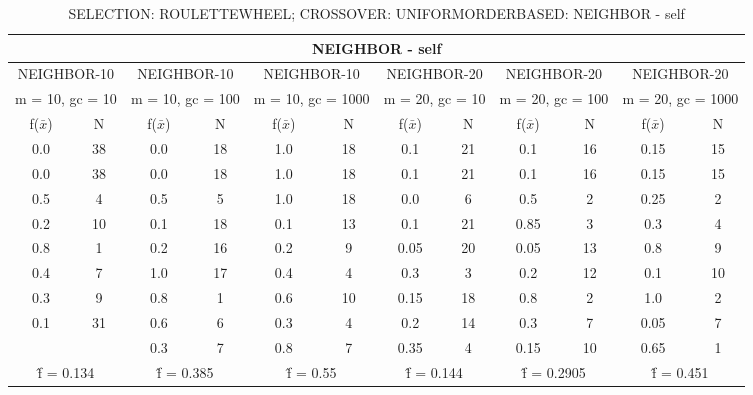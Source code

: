 \begin{table}[H]
	\centering
	\caption{SELECTION: ROULETTEWHEEL; CROSSOVER: UNIFORMORDERBASED: NEIGHBOR - self}
	\begin{adjustbox}{width=1\textwidth}
		\begin{tabular}{ |c|c||c|c||c|c||c|c||c|c||c|c| }
			\hline
			\multicolumn{12}{|c|}{NEIGHBOR - self} \\
			\hline
			\multicolumn{2}{|c||}{NEIGHBOR-10} & \multicolumn{2}{c||}{NEIGHBOR-10} & \multicolumn{2}{c||}{NEIGHBOR-10} & \multicolumn{2}{c||}{NEIGHBOR-20} & \multicolumn{2}{c||}{NEIGHBOR-20} & \multicolumn{2}{c|}{NEIGHBOR-20}\\
			\hline
			\multicolumn{2}{|c||}{m = 10, gc = 10} & \multicolumn{2}{c||}{m = 10, gc = 100} & \multicolumn{2}{c||}{m = 10, gc = 1000} & \multicolumn{2}{c||}{m = 20, gc = 10} & \multicolumn{2}{c||}{m = 20, gc = 100} & \multicolumn{2}{c|}{m = 20, gc = 1000}\\
			\hline
			f($\bar{x}$) & N & f($\bar{x}$) & N & f($\bar{x}$) & N & f($\bar{x}$) & N & f($\bar{x}$) & N & f($\bar{x}$) & N\\
			\hline
			\hline
			0.0 & 38 & 0.0 & 18 & 1.0 & 18 & 0.1 & 21 & 0.1 & 16 & 0.15 & 15\\
			\hline
			0.0 & 38 & 0.0 & 18 & 1.0 & 18 & 0.1 & 21 & 0.1 & 16 & 0.15 & 15\\
			0.5 & 4 & 0.5 & 5 & 1.0 & 18 & 0.0 & 6 & 0.5 & 2 & 0.25 & 2\\
			0.2 & 10 & 0.1 & 18 & 0.1 & 13 & 0.1 & 21 & 0.85 & 3 & 0.3 & 4\\
			0.8 & 1 & 0.2 & 16 & 0.2 & 9 & 0.05 & 20 & 0.05 & 13 & 0.8 & 9\\
			0.4 & 7 & 1.0 & 17 & 0.4 & 4 & 0.3 & 3 & 0.2 & 12 & 0.1 & 10\\
			0.3 & 9 & 0.8 & 1 & 0.6 & 10 & 0.15 & 18 & 0.8 & 2 & 1.0 & 2\\
			0.1 & 31 & 0.6 & 6 & 0.3 & 4 & 0.2 & 14 & 0.3 & 7 & 0.05 & 7\\
			&   & 0.3 & 7 & 0.8 & 7 & 0.35 & 4 & 0.15 & 10 & 0.65 & 1\\
			\hline
			\multicolumn{2}{|c||}{\^{f} = 0.134} & \multicolumn{2}{c||}{\^{f} = 0.385} & \multicolumn{2}{c||}{\^{f} = 0.55} & \multicolumn{2}{c||}{\^{f} = 0.144} & \multicolumn{2}{c||}{\^{f} = 0.2905} & \multicolumn{2}{c|}{\^{f} = 0.451}\\
			\hline
		\end{tabular}
	\end{adjustbox}
\end{table}
